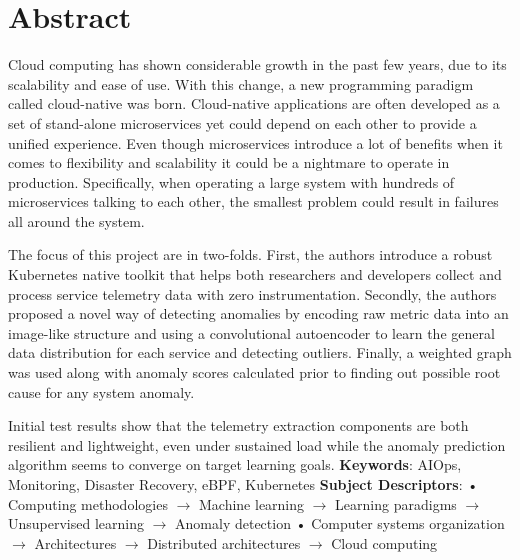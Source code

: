 \chapter*{Abstract}

Cloud computing has shown considerable growth in the past few years, due to its scalability and ease of use. With this change, a new programming paradigm called cloud-native was born. Cloud-native applications are often developed as a set of stand-alone microservices yet could depend on each other to provide a unified experience. Even though microservices introduce a lot of benefits when it comes to flexibility and scalability it could be a nightmare to operate in production. Specifically, when operating a large system with hundreds of microservices talking to each other, the smallest problem could result in failures all around the system.



The focus of this project are in two-folds. First, the authors introduce a robust Kubernetes native toolkit that helps both researchers and developers collect and process service telemetry data with zero instrumentation. Secondly, the authors proposed a novel way of detecting anomalies by encoding raw metric data into an image-like structure and using a convolutional autoencoder to learn the general data distribution for each service and detecting outliers. Finally, a weighted graph was used along with anomaly scores calculated prior to finding out possible root cause for any system anomaly.

Initial test results show that the telemetry extraction components are both resilient and lightweight, even under sustained load while the anomaly prediction algorithm seems to converge on target learning goals.
\newline
\newline
\textbf{Keywords}:
AIOps, Monitoring, Disaster Recovery, eBPF, Kubernetes
\newline
\textbf{Subject Descriptors}:
• Computing methodologies $\rightarrow$ Machine learning $\rightarrow$ Learning paradigms $\rightarrow$ Unsupervised learning $\rightarrow$ Anomaly detection • Computer systems organization $\rightarrow$ Architectures $\rightarrow$ Distributed architectures $\rightarrow$ Cloud computing